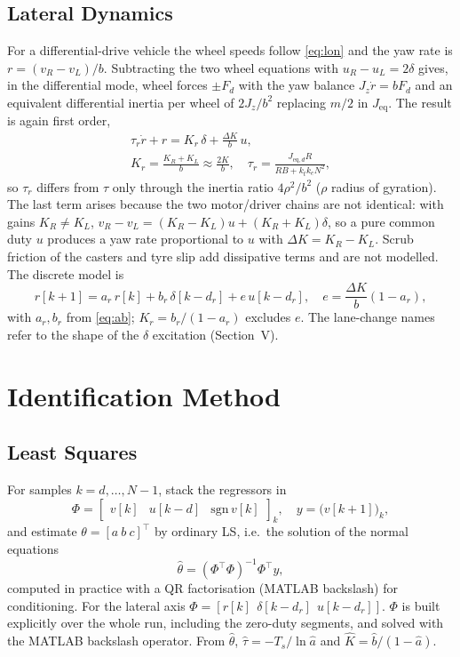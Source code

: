 \documentclass[conference]{IEEEtran}\newcommand{\haveieee}{}%
\begin{document}
\subsection{Lateral Dynamics}
For a differential-drive vehicle the wheel speeds follow \eqref{eq:lon} and the yaw rate is $r=(v_R-v_L)/b$. Subtracting the two wheel equations with $u_R-u_L=2\delta$ gives, in the differential mode, wheel forces $\pm F_d$ with the yaw balance $J_z\dot r=bF_d$ and an equivalent differential inertia per wheel of $2J_z/b^2$ replacing $m/2$ in $J_\mathrm{eq}$. The result is again first order,
\begin{equation}
\begin{gathered}\tau_r\dot r+r=K_r\,\delta+\frac{\Delta K}{b}\,u,\\ K_r=\frac{K_R+K_L}{b}\approx\frac{2K}{b},\quad \tau_r=\frac{J_{\mathrm{eq},d}R}{RB+k_tk_eN^2},\end{gathered}
\label{eq:lat}
\end{equation}
so $\tau_r$ differs from $\tau$ only through the inertia ratio $4\rho^2/b^2$ ($\rho$ radius of gyration). The last term arises because the two motor/driver chains are not identical: with gains $K_R\neq K_L$, $v_R-v_L=(K_R-K_L)u+(K_R+K_L)\delta$, so a pure common duty $u$ produces a yaw rate proportional to $u$ with $\Delta K=K_R-K_L$. Scrub friction of the casters and tyre slip add dissipative terms and are not modelled. The discrete model is
\begin{equation}
r[k{+}1]=a_r\,r[k]+b_r\,\delta[k{-}d_r]+e\,u[k{-}d_r],\quad e=\frac{\Delta K}{b}(1-a_r),
\label{eq:latd}
\end{equation}
with $a_r,b_r$ from \eqref{eq:ab}; $K_r=b_r/(1-a_r)$ excludes $e$. The lane-change names refer to the shape of the $\delta$ excitation (Section~V).

\section{Identification Method}
\subsection{Least Squares}
For samples $k=d,\dots,N-1$, stack the regressors in
\begin{equation}
\Phi=\begin{bmatrix}v[k]&u[k{-}d]&\mathrm{sgn}\,v[k]\end{bmatrix}_{k},\quad y=\big(v[k{+}1]\big)_k,
\label{eq:phi}
\end{equation}
and estimate $\theta=[a\ b\ c]^\top$ by ordinary LS, i.e.\ the solution of the normal equations
\begin{equation}
\hat\theta=(\Phi^\top\Phi)^{-1}\Phi^\top y,
\label{eq:ls}
\end{equation}
computed in practice with a QR factorisation (MATLAB backslash) for conditioning. For the lateral axis $\Phi=[r[k]\ \ \delta[k{-}d_r]\ \ u[k{-}d_r]]$. $\Phi$ is built explicitly over the whole run, including the zero-duty segments, and solved with the MATLAB backslash operator. From $\hat\theta$, $\hat\tau=-T_s/\ln\hat a$ and $\hat K=\hat b/(1-\hat a)$.
\end{document}
